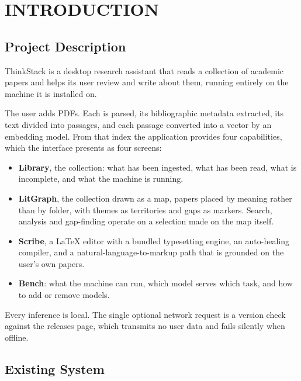 \documentclass[12pt,a4paper]{report}
\begin{document}
\setcounter{page}{1}

\chapter{INTRODUCTION}

\section{Project Description}

ThinkStack is a desktop research assistant that reads a collection of academic
papers and helps its user review and write about them, running entirely on the
machine it is installed on.

The user adds PDFs. Each is parsed, its bibliographic metadata extracted, its
text divided into passages, and each passage converted into a vector by an
embedding model. From that index the application provides four capabilities,
which the interface presents as four screens:

\begin{itemize}[leftmargin=*]
  \item \textbf{Library}, the collection: what has been ingested, what has
        been read, what is incomplete, and what the machine is running.
  \item \textbf{LitGraph}, the collection drawn as a map, papers placed by
        meaning rather than by folder, with themes as territories and gaps as
        markers. Search, analysis and gap-finding operate on a selection made
        on the map itself.
  \item \textbf{Scribe}, a \LaTeX{} editor with a bundled typesetting engine,
        an auto-healing compiler, and a natural-language-to-markup path that is
        grounded on the user's own papers.
  \item \textbf{Bench}: what the machine can run, which model serves which
        task, and how to add or remove models.
\end{itemize}

Every inference is local. The single optional network request is a version
check against the releases page, which transmits no user data and fails
silently when offline.

\section{Existing System}
\end{document}
